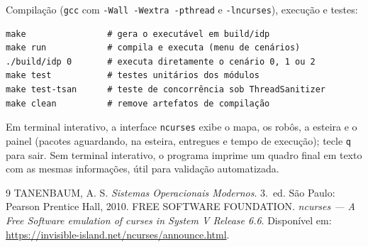 \documentclass[12pt]{article}
\begin{document}
Compilação (\texttt{gcc} com \texttt{-Wall -Wextra -pthread} e \texttt{-lncurses}),
execução e testes:

{\small
\begin{verbatim}
make                # gera o executável em build/idp
make run            # compila e executa (menu de cenários)
./build/idp 0       # executa diretamente o cenário 0, 1 ou 2
make test           # testes unitários dos módulos
make test-tsan      # teste de concorrência sob ThreadSanitizer
make clean          # remove artefatos de compilação
\end{verbatim}
}

Em terminal interativo, a interface \texttt{ncurses} exibe o mapa, os robôs, a
esteira e o painel (pacotes aguardando, na esteira, entregues e tempo de
execução); tecle \texttt{q} para sair. Sem terminal interativo, o programa imprime
um quadro final em texto com as mesmas informações, útil para validação
automatizada.

\begin{thebibliography}{9}
 TANENBAUM, A. S. \textit{Sistemas Operacionais Modernos}.
  3.~ed. São Paulo: Pearson Prentice Hall, 2010.
 FREE SOFTWARE FOUNDATION. \textit{ncurses --- A Free Software
  emulation of curses in System V Release 6.6}. Disponível em:
  \url{https://invisible-island.net/ncurses/announce.html}.
\end{thebibliography}
\end{document}
